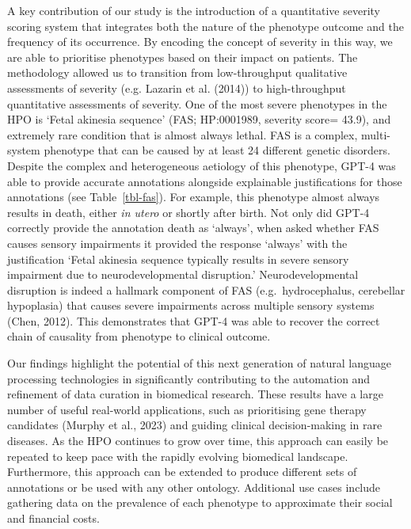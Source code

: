 \documentclass[
]{agujournal2019}
\begin{document}
A key contribution of our study is the introduction of a quantitative
severity scoring system that integrates both the nature of the phenotype
outcome and the frequency of its occurrence. By encoding the concept of
severity in this way, we are able to prioritise phenotypes based on
their impact on patients. The methodology allowed us to transition from
low-throughput qualitative assessments of severity (e.g. Lazarin et al.
(2014)) to high-throughput quantitative assessments of severity. One of
the most severe phenotypes in the HPO is `Fetal akinesia sequence' (FAS;
HP:0001989, severity score= 43.9), and extremely rare condition that is
almost always lethal. FAS is a complex, multi-system phenotype that can
be caused by at least 24 different genetic disorders. Despite the
complex and heterogeneous aetiology of this phenotype, GPT-4 was able to
provide accurate annotations alongside explainable justifications for
those annotations (see Table~\ref{tbl-fas}). For example, this phenotype
almost always results in death, either \emph{in utero} or shortly after
birth. Not only did GPT-4 correctly provide the annotation death as
`always', when asked whether FAS causes sensory impairments it provided
the response `always' with the justification `Fetal akinesia sequence
typically results in severe sensory impairment due to neurodevelopmental
disruption.' Neurodevelopmental disruption is indeed a hallmark
component of FAS (e.g.~hydrocephalus, cerebellar hypoplasia) that causes
severe impairments across multiple sensory systems (Chen, 2012). This
demonstrates that GPT-4 was able to recover the correct chain of
causality from phenotype to clinical outcome.

Our findings highlight the potential of this next generation of natural
language processing technologies in significantly contributing to the
automation and refinement of data curation in biomedical research. These
results have a large number of useful real-world applications, such as
prioritising gene therapy candidates (Murphy et al., 2023) and guiding
clinical decision-making in rare diseases. As the HPO continues to grow
over time, this approach can easily be repeated to keep pace with the
rapidly evolving biomedical landscape. Furthermore, this approach can be
extended to produce different sets of annotations or be used with any
other ontology. Additional use cases include gathering data on the
prevalence of each phenotype to approximate their social and financial
costs.
\end{document}
